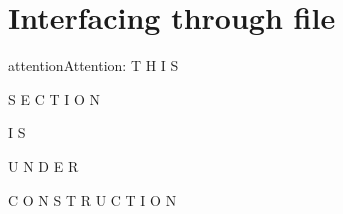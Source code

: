 \documentclass[letterpaper,10pt,english]{jupyterBook}
\begin{document}
\chapter{Interfacing through file}
\label{\detokenize{08_Interfacing_through_file:interfacing-through-file}}\label{\detokenize{08_Interfacing_through_file::doc}}
\begin{sphinxadmonition}{attention}{Attention:}
\sphinxAtStartPar
T H I S

\sphinxAtStartPar
S E C T I O N

\sphinxAtStartPar
I S

\sphinxAtStartPar
U N D E R

\sphinxAtStartPar
C O N S T R U C T I O N
\end{sphinxadmonition}

\sphinxAtStartPar
{}

\sphinxAtStartPar
{}
\end{document}
